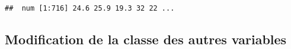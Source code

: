 \documentclass[7pt,]{report}
\newenvironment{Shaded}{\begin{snugshade}}{\end{snugshade}}
\newcommand{\DataTypeTok}[1]{\textcolor[rgb]{0.13,0.29,0.53}{#1}}
\newcommand{\KeywordTok}[1]{\textcolor[rgb]{0.13,0.29,0.53}{\textbf{#1}}}
\newcommand{\NormalTok}[1]{#1}
\newcommand{\OperatorTok}[1]{\textcolor[rgb]{0.81,0.36,0.00}{\textbf{#1}}}
\newcommand{\StringTok}[1]{\textcolor[rgb]{0.31,0.60,0.02}{#1}}
\begin{document}
\begin{Shaded}
\end{Shaded}

\begin{verbatim}
##  num [1:716] 24.6 25.9 19.3 32 22 ...
\end{verbatim}

\hypertarget{modification-de-la-classe-des-autres-variables}{%
\subsection{Modification de la classe des autres variables}\label{modification-de-la-classe-des-autres-variables}}
\end{document}
